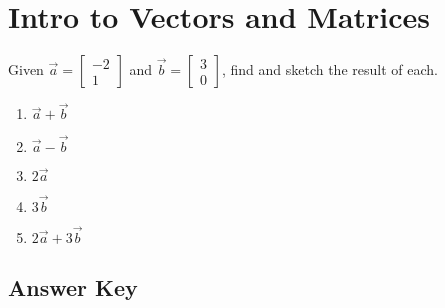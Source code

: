 \chapter{Intro to Vectors and Matrices}

Given $\vec{a} = \begin{bmatrix} -2 \\ 1 \end{bmatrix}$ and $\vec{b} = \begin{bmatrix} 3 \\ 0 \end{bmatrix}$, find and sketch the result of each.

\begin{multicols}{5}
\begin{enumerate}
	\item $\vec{a} + \vec{b}$
	\item $\vec{a} - \vec{b}$
	\item $2\vec{a}$
	\item $3\vec{b} $
	\item $2\vec{a} + 3\vec{b}$
\end{enumerate}	\setcounter{Review}{\value{enumi}}
\end{multicols}

\newpage

\section{Answer Key}

